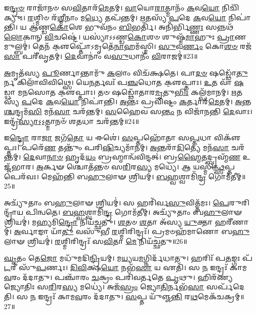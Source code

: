 𑌇\-\ul{𑌨𑍍𑌦𑍍𑌰}\-\-\ul{𑍞} 𑌰𑌾𑌜𑌾᳴𑌨𑍞 𑌸\-\ul{𑌵𑌿}\-𑌤𑌾𑌰᳴\-\ul{𑌮𑍇}\-𑌤𑌮𑍍। 
\-\ul{𑌵𑌾}\-𑌯𑍋\-\ul{𑌰𑌾}\-𑌤𑍍𑌮𑌾𑌨𑌂᳴ \ul{𑌕}\-𑌵\-\ul{𑌯𑍋} 𑌨𑌿𑌚𑌿᳴𑌕𑍍𑌯𑍁𑌃। 
\-\ul{𑌰}\-𑌶𑍍𑌮𑌿𑍞 𑌰᳴\-\ul{𑌶𑍍𑌮𑍀}\-𑌨𑌾𑌂 𑌮\-\ul{𑌧𑍍𑌯𑍇} 𑌤𑌪᳴𑌨𑍍𑌤𑌮𑍍। 
\-\ul{𑌋}\-𑌤𑌸𑍍𑌯᳴ \ul{𑌪}\-𑌦𑍇 \ul{𑌕}\-𑌵\-\ul{𑌯𑍋} 𑌨𑌿𑌪𑌾॑𑌨𑍍𑌤𑌿। 
𑌯 𑌆॑𑌣𑍍𑌡\-\ul{𑌕𑍋}\-𑌶𑍇 𑌭𑍁𑌵᳴𑌨𑌂 \ul{𑌬𑌿}\-𑌭𑌰𑍍𑌤𑌿᳴। 
𑌅𑌨𑌿᳴𑌰𑍍𑌭𑌿\-\ul{𑌣𑍍𑌣𑌃} 𑌸𑌨𑍍𑌨𑌥᳴ \ul{𑌲𑍋}\-𑌕𑌾𑌨𑍍 \ul{𑌵𑌿}\-𑌚𑌷𑍍𑌟𑍇॑। 
𑌯𑌸𑍍𑌯𑌾॑𑌽𑌽𑌣𑍍𑌡\-\ul{𑌕𑍋}\-𑌶𑍞 𑌶𑍁𑌷𑍍𑌮᳴\-\ul{𑌮𑌾}\-𑌹𑍁𑌃 \ul{𑌪𑍍𑌰𑌾}\-𑌣𑌮𑍁𑌲𑍍𑌬𑌮𑍍॑। 
𑌤𑍇𑌨᳴ 𑌕𑍢॒𑌪𑍍𑌤𑍋᳴𑌽𑌮𑍃𑌤𑍇᳴\-\ul{𑌨𑌾}\-𑌹𑌮᳴𑌸𑍍𑌮𑌿। 
\-\ul{𑌸𑍁}\-𑌵\-\ul{𑌰𑍍𑌣𑌂} 𑌕𑍋\-\ul{𑌶}\-\-\ul{𑍞} 𑌰𑌜᳴\-\ul{𑌸𑌾} 𑌪𑌰𑍀᳴𑌵𑍃𑌤𑌮𑍍। 
\-\ul{𑌦𑍇}\-𑌵𑌾𑌨𑌾𑌂॑ 𑌵\-\ul{𑌸𑍁}\-𑌧𑌾𑌨𑍀𑌂॑  \ul{𑌵𑌿}\-𑌰𑌾𑌜𑌮𑍍॑॥23॥%

\-\ul{𑌅}\-𑌮𑍃𑌤᳴𑌸𑍍𑌯 \ul{𑌪𑍂}\-𑌰𑍍𑌣𑌾𑌨𑍍𑌤𑌾𑌮𑍁᳴ \ul{𑌕}\-𑌲𑌾𑌂  𑌵𑌿𑌚᳴𑌕𑍍𑌷𑌤𑍇। 
𑌪𑌾\-\ul{𑌦}\-\-\ul{𑍞} 𑌷𑌡𑍍𑌢𑍋᳴\-\ul{𑌤𑍁}\-𑌰𑍍𑌨 𑌕𑌿𑌲𑌾᳴𑌵𑌿𑌵𑌿𑌥𑍍𑌸𑍇। 
𑌯𑍇\-\ul{𑌨}\-𑌰𑍍𑌤𑌵𑌃᳴ 𑌪\-\ul{𑌞𑍍𑌚}\-𑌧𑍋𑌤 𑌕𑍢॒𑌪𑍍𑌤𑌾𑌃। 
\-\ul{𑌉}\-𑌤 𑌵𑌾᳴ \ul{𑌷}\-𑌡𑍍𑌧𑌾 𑌮\-\ul{𑌨}\-𑌸𑍋𑌤 𑌕𑍢॒𑌪𑍍𑌤𑌾𑌃। 
𑌤𑍞 𑌷𑌡𑍍𑌢𑍋᳴𑌤𑌾𑌰\-\ul{𑌮𑍃}\-𑌤𑍁\-\ul{𑌭𑌿𑌃} 𑌕𑌲𑍍𑌪᳴𑌮𑌾𑌨𑌮𑍍। 
\-\ul{𑌋}\-𑌤𑌸𑍍𑌯᳴ \ul{𑌪}\-𑌦𑍇 \ul{𑌕}\-𑌵\-\ul{𑌯𑍋} 𑌨𑌿𑌪𑌾॑𑌨𑍍𑌤𑌿। 
\-\ul{𑌅}\-𑌨𑍍𑌤𑌃 𑌪𑍍𑌰𑌵𑌿᳴𑌷𑍍𑌟𑌂 \ul{𑌕}\-𑌰𑍍𑌤𑌾𑌰᳴\-\ul{𑌮𑍇}\-𑌤𑌮𑍍। 
\-\ul{𑌅}\-𑌨𑍍𑌤\-\ul{𑌶𑍍𑌚}\-𑌨𑍍𑌦𑍍𑌰𑌮᳴\-\ul{𑌸𑌿} 𑌮𑌨᳴\-\ul{𑌸𑌾} 𑌚𑌰᳴𑌨𑍍𑌤𑌮𑍍। 
\-\ul{𑌸}\-𑌹𑍈𑌵 𑌸\-\ul{𑌨𑍍𑌤𑌂} 𑌨 𑌵𑌿𑌜𑌾᳴𑌨𑌨𑍍𑌤𑌿 \ul{𑌦𑍇}\-𑌵𑌾𑌃। 
𑌇𑌨𑍍𑌦𑍍𑌰᳴\-\ul{𑌸𑍍𑌯𑌾}\-𑌽॒𑌽॒𑌤𑍍𑌮𑌾𑌨𑍞᳴ 𑌶\-\ul{𑌤}\-𑌧𑌾 𑌚𑌰᳴𑌨𑍍𑌤𑌮𑍍॥24॥%

𑌇\-\ul{𑌨𑍍𑌦𑍍𑌰𑍋} 𑌰𑌾\-\ul{𑌜𑌾} 𑌜𑌗᳴\-\ul{𑌤𑍋} 𑌯 𑌈𑌶𑍇॑। 
\-\ul{𑌸}\-𑌪𑍍𑌤𑌹𑍋᳴𑌤𑌾 𑌸\-\ul{𑌪𑍍𑌤}\-𑌧𑌾 𑌵𑌿𑌕𑍢᳴𑌪𑍍𑌤𑌃। 
𑌪𑌰𑍇᳴\-\ul{𑌣} 𑌤𑌨𑍍𑌤𑍁𑌂᳴ 𑌪𑌰𑌿\-\ul{𑌷𑌿}\-𑌚𑍍𑌯𑌮𑌾᳴𑌨𑌮𑍍। 
\-\ul{𑌅}\-𑌨𑍍𑌤𑌰𑌾᳴\-\ul{𑌦𑌿}\-𑌤𑍍𑌯𑍇 𑌮𑌨᳴\-\ul{𑌸𑌾} 𑌚𑌰᳴𑌨𑍍𑌤𑌮𑍍। 
\-\ul{𑌦𑍇}\-𑌵𑌾\-\ul{𑌨𑌾}\-\-\ul{𑍞} 𑌹𑍃𑌦᳴\-\ul{𑌯𑌂} 𑌬𑍍𑌰𑌹𑍍𑌮𑌾𑌨𑍍𑌵᳴𑌵𑌿𑌨𑍍𑌦𑌤𑍍। 
𑌬𑍍𑌰\-\ul{𑌹𑍍𑌮𑍈}\-𑌤𑌦𑍍𑌬𑍍𑌰𑌹𑍍𑌮᳴\-\ul{𑌣} 𑌉𑌜𑍍𑌜᳴𑌭𑌾𑌰। 
\-\ul{𑌅}\-𑌰𑍍𑌕𑍟 𑌶𑍍𑌚𑍋𑌤᳴𑌨𑍍𑌤𑍞 𑌸\-\ul{𑌰𑌿}\-𑌰\-\ul{𑌸𑍍𑌯} 𑌮𑌧𑍍𑌯𑍇॑। 
𑌆 𑌯𑌸𑍍𑌮𑌿॑\-\ul{𑌨𑍍𑌥𑍍𑌸}\-𑌪𑍍𑌤 𑌪𑍇𑌰᳴𑌵𑌃। 
𑌮𑍇𑌹᳴𑌨𑍍𑌤𑌿 𑌬\-\ul{𑌹𑍁}\-𑌲𑌾𑍟 𑌶𑍍𑌰𑌿𑌯𑌮𑍍॑। 
\-\ul{𑌬}\-\-\ul{𑌹𑍍𑌵}\-𑌶𑍍𑌵𑌾𑌮𑌿᳴\-\ul{𑌨𑍍𑌦𑍍𑌰} 𑌗𑍋𑌮᳴𑌤𑍀𑌮𑍍॥25॥%

𑌅𑌚𑍍𑌯𑍁᳴𑌤𑌾𑌂 𑌬\-\ul{𑌹𑍁}\-𑌲𑌾𑍟 𑌶𑍍𑌰𑌿𑌯𑌮𑍍॑। 
𑌸 𑌹𑌰𑌿᳴𑌰𑍍𑌵\-\ul{𑌸𑍁}\-𑌵𑌿𑌤𑍍𑌤᳴𑌮𑌃। 
\-\ul{𑌪𑍇}\-𑌰𑍁𑌰𑌿𑌨𑍍𑌦𑍍𑌰𑌾᳴𑌯 𑌪𑌿𑌨𑍍𑌵𑌤𑍇। 
\-\ul{𑌬}\-\-\ul{𑌹𑍍𑌵}\-𑌶𑍍𑌵𑌾𑌮𑌿᳴\-\ul{𑌨𑍍𑌦𑍍𑌰} 𑌗𑍋𑌮᳴𑌤𑍀𑌮𑍍। 
𑌅𑌚𑍍𑌯𑍁᳴𑌤𑌾𑌂 𑌬\-\ul{𑌹𑍁}\-𑌲𑌾𑍟 𑌶𑍍𑌰𑌿𑌯𑌮𑍍॑। 
𑌮\-\ul{𑌹𑍍𑌯}\-𑌮𑌿\-\ul{𑌨𑍍𑌦𑍍𑌰𑍋} 𑌨𑌿𑌯᳴𑌚𑍍𑌛𑌤𑍁। 
\-\ul{𑌶}\-𑌤𑍞 \ul{𑌶}\-𑌤𑌾 𑌅᳴𑌸𑍍𑌯 \ul{𑌯𑍁}\-𑌕𑍍𑌤𑌾 𑌹𑌰𑍀᳴𑌣𑌾𑌮𑍍। 
\-\ul{𑌅}\-𑌰𑍍𑌵𑌾𑌙𑌾 𑌯𑌾᳴\-\ul{𑌤𑍁} 𑌵𑌸𑍁᳴𑌭𑍀 \ul{𑌰}\-𑌶𑍍𑌮𑌿𑌰𑌿𑌨𑍍𑌦𑍍𑌰𑌃᳴। 
𑌪𑍍𑌰𑌮𑍞𑌹᳴𑌮𑌾𑌣𑍋 𑌬\-\ul{𑌹𑍁}\-𑌲𑌾𑍟 𑌶𑍍𑌰𑌿𑌯𑌮𑍍॑। 
\-\ul{𑌰}\-𑌶𑍍𑌮𑌿𑌰𑌿𑌨𑍍𑌦𑍍𑌰𑌃᳴ 𑌸\-\ul{𑌵𑌿}\-𑌤𑌾 \ul{𑌮𑍇} 𑌨𑌿𑌯᳴𑌚𑍍𑌛𑌤𑍁॥26॥%

\-\ul{𑌘𑍃}\-𑌤𑌂 𑌤𑍇\-\ul{𑌜𑍋} 𑌮𑌧𑍁᳴𑌮𑌦𑌿\-\ul{𑌨𑍍𑌦𑍍𑌰𑌿}\-𑌯𑌮𑍍। 
𑌮\-\ul{𑌯𑍍𑌯}\-𑌯\-\ul{𑌮}\-𑌗𑍍𑌨𑌿𑌰𑍍𑌦᳴𑌧𑌾𑌤𑍁। 
𑌹𑌰𑌿𑌃᳴ 𑌪\-\ul{𑌤}\-𑌙𑍍𑌗𑌃 𑌪᳴\-\ul{𑌟}\-𑌰𑍀 𑌸𑍁᳴\-\ul{𑌪}\-𑌰𑍍𑌣𑌃। 
\-\ul{𑌦𑌿}\-\-\ul{𑌵𑌿}\-𑌕𑍍𑌷\-\ul{𑌯𑍋} 𑌨𑌭᳴\-\ul{𑌸𑌾} 𑌯 𑌏𑌤𑌿᳴। 
𑌸 \ul{𑌨} 𑌇𑌨𑍍𑌦𑍍𑌰𑌃᳴ 𑌕𑌾𑌮\-\ul{𑌵}\-𑌰𑌂 𑌦᳴𑌦𑌾𑌤𑍁। 
𑌪𑌞𑍍𑌚𑌾᳴𑌰𑌂 \ul{𑌚}\-𑌕𑍍𑌰𑌂 𑌪𑌰𑌿᳴𑌵𑌰𑍍𑌤𑌤𑍇 \ul{𑌪𑍃}\-𑌥𑍁। 
𑌹𑌿𑌰᳴𑌣𑍍𑌯𑌜𑍍𑌯𑍋𑌤𑌿𑌃 𑌸\-\ul{𑌰𑌿}\-𑌰\-\ul{𑌸𑍍𑌯} 𑌮𑌧𑍍𑌯𑍇॑। 
𑌅𑌜᳴\-\ul{𑌸𑍍𑌰𑌂} 𑌜𑍍𑌯𑍋\-\ul{𑌤𑌿}\-𑌰𑍍𑌨𑌭᳴\-\ul{𑌸𑌾} 𑌸𑌰𑍍𑌪᳴𑌦𑍇𑌤𑌿। 
𑌸 \ul{𑌨} 𑌇𑌨𑍍𑌦𑍍𑌰𑌃᳴ 𑌕𑌾𑌮\-\ul{𑌵}\-𑌰𑌂 𑌦᳴𑌦𑌾𑌤𑍁। 
\-\ul{𑌸}\-𑌪𑍍𑌤 𑌯𑍁᳴𑌞𑍍𑌜\-\ul{𑌨𑍍𑌤𑌿} 𑌰\-\ul{𑌥}\-𑌮𑍇𑌕᳴𑌚𑌕𑍍𑌰𑌮𑍍॥27॥%

